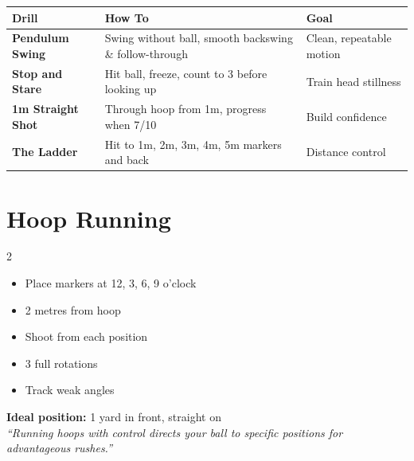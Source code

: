 \documentclass[11pt,a4paper]{article}
\begin{document}
\begin{tabular}{@{}p{3.5cm}p{7cm}p{4cm}@{}}
\toprule
\textbf{Drill} & \textbf{How To} & \textbf{Goal} \\
\midrule
\textbf{Pendulum Swing} & Swing without ball, smooth backswing \& follow-through & Clean, repeatable motion \\
\textbf{Stop and Stare} & Hit ball, freeze, count to 3 before looking up & Train head stillness \\
\textbf{1m Straight Shot} & Through hoop from 1m, progress when 7/10 & Build confidence \\
\textbf{The Ladder} & Hit to 1m, 2m, 3m, 4m, 5m markers and back & Distance control \\
\bottomrule
\end{tabular}

\vspace{0.5em}

\section{Hoop Running}

\begin{multicols}{2}

\begin{tcolorbox}[drillbox, title={Clock Face Drill}]
\begin{itemize}
    \item Place markers at 12, 3, 6, 9 o'clock
    \item 2 metres from hoop
    \item Shoot from each position
    \item 3 full rotations
    \item Track weak angles
\end{itemize}
\end{tcolorbox}

\begin{tcolorbox}[drillbox, colframe=aitoncolor!70, title={\color{aitoncolor}Aiton's Approach}]
\textbf{Ideal position:} 1 yard in front, straight on\\[0.3em]
\textit{``Running hoops with control directs your ball to specific positions for advantageous rushes.''}
\end{tcolorbox}

\end{multicols}
\end{document}
